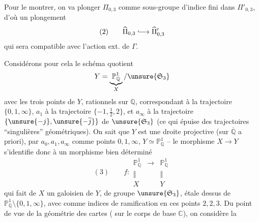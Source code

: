 Pour le montrer, on va plonger
$\Pi_{0,3}$ comme sous-groupe d'indice fini
dans $\Pi'_{0,3}$, d'où un plongement 
\[
(2)\qquad\widehat{\Pi}_{0,3}\lhook\joinrel\longrightarrow\widehat{\Pi}'_{0,3}
\]
qui sera compatible avec l'action ext. de $\Gamma$.

Considérons pour cela le schéma quotient
\[
Y=\underbrace{\mathbb P^1_{\mathbb Q}}_{X}/\unsure{\mathfrak S_3}
\]
avec les trois points  de $Y$, rationnels sur
$\mathbb Q$,  correspondant à la trajectoire
 $\{0,1,\infty\}$, $a_1$ à la trajectoire
$\{-1,\frac12,2\}$, et $a_\infty$ à la trajectoire
$\{\unsure{-j},\unsure{-\overline j}\}$ de $\unsure{\mathfrak S_3}$
(ce qui épuise  des trajectoires
``singulières'' géométriques). On sait que $Y$ est une droite projective
(sur $\overline{\mathbb Q}$ a priori),   par
$a_0,a_1,a_\infty$ comme points $0,1,\infty$, 
$Y\simeq\mathbb P^1_{\mathbb Q}$ -- le  morphisme
$X\longrightarrow Y$ s'identifie donc à un morphisme bien déterminé
\[
(3)\qquad
f:\begin{array}{ccc}
\mathbb P^1_{\mathbb Q}&\longrightarrow&\mathbb P^1_{\mathbb Q}\\
\Vert&&\Vert\\
X&&Y
\end{array}
\]
qui fait de $X$ un  galoisien de $Y$, de groupe
$\unsure{\mathfrak S_3}$, étale  dessus de
$\mathbb P^1_{\mathbb Q}\setminus\{0,1,\infty\}$, avec comme indices de
ramification en ces points $2,2,3$. Du point de vue de la géométrie des cartes
( sur le corps de base $\mathbb C$), on considère la

